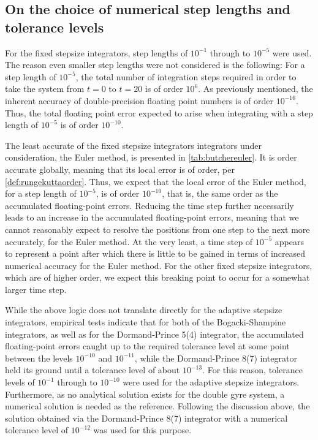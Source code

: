 \subsection{On the choice of numerical step lengths and tolerance levels}
\label{sub:on_the_choice_of_numerical_step_lengths_and_tolerance_levels}

For the fixed stepsize integrators, step lengths of $10^{-1}$ through to
$10^{-5}$ were used. The reason even smaller step lengths were not considered
is the following: For a step length of $10^{-5}$, the total number of
integration steps required in order to take the system from $t=0$ to $t=20$
is of order $10^{6}$. As previously mentioned, the inherent accuracy of
double-precision floating point numbers is of order $10^{-16}$. Thus, the
total floating point error expected to arise when integrating with a step
length of $10^{-5}$ is of order $10^{-10}$.

The least accurate of the fixed stepsize integrators integrators under
consideration, the Euler method, is presented in \cref{tab:butchereuler}. It is
 order accurate globally, meaning that its local error is of 
order, per \cref{def:rungekuttaorder}. Thus, we expect that the local error of
the Euler method, for a step length of $10^{-5}$, is of order $10^{-10}$, that
is, the same order as the accumulated floating-point errors. Reducing the time
step further necessarily leads to an increase in the accumulated floating-point
errors, meaning that we cannot reasonably expect to resolve the positions
from one step to the next more accurately, for the Euler method. At the very
least, a time step of $10^{-5}$ appears to represent a point after which
there is little to be gained in terms of increased numerical accuracy for the
Euler method. For the other fixed stepsize integrators, which are of higher
order, we expect this breaking point to occur for a somewhat larger time step.

While the above logic does not translate directly for the adaptive stepsize
integrators, empirical tests indicate that for both of the Bogacki-Shampine
integrators, as well as for the Dormand-Prince 5(4) integrator, the accumulated
floating-point errors caught up to the required tolerance level at some point
between the levels $10^{-10}$ and $10^{-11}$, while the Dormand-Prince 8(7)
integrator held its ground until a tolerance level of about $10^{-13}$. For this
reason, tolerance levels of $10^{-1}$ through to $10^{-10}$ were used for the
adaptive stepsize integrators. Furthermore, as no analytical solution exists
for the double gyre system, a numerical solution is needed as the reference.
Following the discussion above, the solution obtained via the Dormand-Prince
8(7) integrator with a numerical tolerance level of $10^{-12}$ was used for
this purpose.


